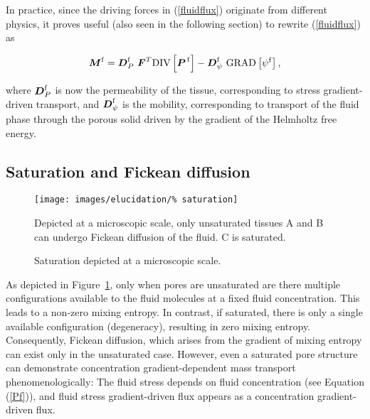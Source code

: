 In practice, since the driving forces in (\ref{fluidflux}) originate
from different physics, it proves useful (also seen in the following
section) to rewrite (\ref{fluidflux}) as

\begin{equation}
\bM^\mathrm{f} = \bD^\mathrm{f}_{P}\ \bF^T\mathrm{DIV}
\left[\bP^{\,\mathrm{f}}\right] -
\bD^\mathrm{f}_{\psi}\ \mathrm{GRAD}\left[\psi^\mathrm{f}\right],
\label{splitflux}
\end{equation}

\noindent where $\mbox{\boldmath$ D$}^\mathrm{f}_{P}$ is now the permeability of the
tissue, corresponding to stress gradient-driven transport, and
$\mbox{\boldmath$ D$}^\mathrm{f}_{\psi}$ is the mobility, corresponding to transport of
the fluid phase through the porous solid driven by the gradient of the
Helmholtz free energy.

\subsection{Saturation and Fickean diffusion}
\label{saturation-and-fickean-diffusion}

\begin{figure}
  \begin{center}
    \texttt{[image: images/elucidation/\%
      saturation]}
    \caption{Saturation depicted at a microscopic scale.}
    \label{fickean-diffusion}
  \end{center}
      {Depicted at a microscopic scale, only unsaturated tissues A and
        B can undergo Fickean diffusion of the fluid. C is saturated.}
\end{figure}

As depicted in Figure~\ref{fickean-diffusion}, only when pores are
unsaturated are there multiple configurations available to the fluid
molecules at a fixed fluid concentration.  This leads to a non-zero
mixing entropy. In contrast, if saturated, there is only a single
available configuration (degeneracy), resulting in zero mixing
entropy. Consequently, Fickean diffusion, which arises from the
gradient of mixing entropy can exist only in the unsaturated
case. However, even a saturated pore structure can demonstrate
concentration gradient-dependent mass transport phenomenologically:
The fluid stress depends on fluid concentration (see Equation
(\ref{Pf})), and fluid stress gradient-driven flux appears as a
concentration gradient-driven flux.

